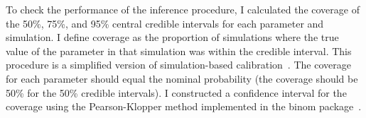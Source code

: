 \documentclass[thesis.tex]{subfiles}
\begin{document}

To check the performance of the inference procedure, I calculated the coverage of the 50\%, 75\%, and 95\% central credible intervals for each parameter and simulation.
I define coverage as the proportion of simulations where the true value of the parameter in that simulation was within the credible interval.
This procedure is a simplified version of simulation-based calibration~\autocites{cookValidation}{taltsValidating}.
The coverage for each parameter should equal the nominal probability (\eg the coverage should be 50\% for the 50\% credible intervals).
I constructed a confidence interval for the coverage using the Pearson-Klopper method implemented in the binom package~\autocite{binom1-1}.
\end{document}
